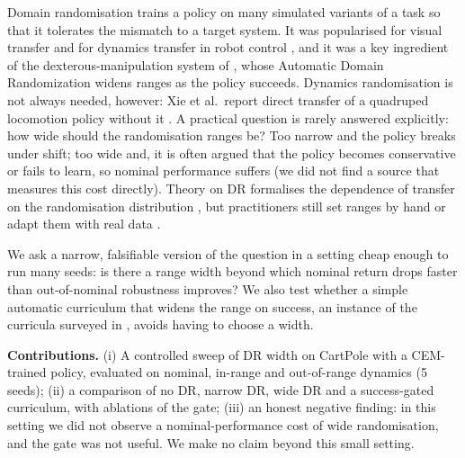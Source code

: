 Domain randomisation trains a policy on many simulated variants of a task so that it tolerates the mismatch to a target system. It was popularised for visual transfer \cite{tobin2017domain} and for dynamics transfer in robot control \cite{peng2018sim}, and it was a key ingredient of the dexterous-manipulation system of \cite{openai2019solving}, whose Automatic Domain Randomization widens ranges as the policy succeeds. Dynamics randomisation is not always needed, however: Xie et al.\ report direct transfer of a quadruped locomotion policy without it \cite{xie2021dynamics}. A practical question is rarely answered explicitly: how wide should the randomisation ranges be? Too narrow and the policy breaks under shift; too wide and, it is often argued that the policy becomes conservative or fails to learn, so nominal performance suffers (we did not find a source that measures this cost directly). Theory on DR formalises the dependence of transfer on the randomisation distribution \cite{chen2021understanding}, but practitioners still set ranges by hand or adapt them with real data \cite{chebotar2019closing,tiboni2022dropo}.

We ask a narrow, falsifiable version of the question in a setting cheap enough to run many seeds: is there a range width beyond which nominal return drops faster than out-of-nominal robustness improves? We also test whether a simple automatic curriculum that widens the range on success, an instance of the curricula surveyed in \cite{portelas2020automatic}, avoids having to choose a width.

\textbf{Contributions.} (i) A controlled sweep of DR width on CartPole with a CEM-trained policy, evaluated on nominal, in-range and out-of-range dynamics (5 seeds); (ii) a comparison of no DR, narrow DR, wide DR and a success-gated curriculum, with ablations of the gate; (iii) an honest negative finding: in this setting we did not observe a nominal-performance cost of wide randomisation, and the gate was not useful. We make no claim beyond this small setting.
